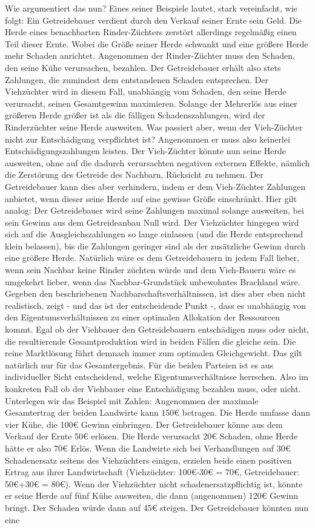 Wie argumentiert \textcite[S. 2ff]{Coase1960} das nun? Eines seiner Beispiele lautet, stark vereinfacht, wie folgt: Ein Getreidebauer verdient durch den Verkauf seiner Ernte sein Geld. Die Herde eines benachbarten Rinder-Züchters zerstört allerdings regelmäßig einen Teil dieser Ernte. Wobei die Größe seiner Herde schwankt und eine größere Herde mehr Schaden anrichtet. Angenommen der Rinder-Züchter muss den Schaden, den seine Kühe verursachen, bezahlen. Der Getreidebauer erhält also stets Zahlungen, die zumindest dem entstandenen Schaden entsprechen. Der Viehzüchter wird in diesem Fall, unabhängig vom Schaden, den seine Herde verursacht, seinen Gesamtgewinn maximieren. Solange der Mehrerlös aus einer größeren Herde größer ist als die fälligen Schadenszahlungen, wird der Rinderzüchter seine Herde ausweiten. Was passiert aber, wenn der Vieh-Züchter nicht zur Entschädigung verpflichtet ist? Angenommen er muss also keinerlei Entschädigungszahlungen leisten. Der Vieh-Züchter könnte nun seine Herde ausweiten, ohne auf die dadurch verursachten negativen externen Effekte, nämlich die Zerstörung des Getreide des Nachbarn, Rücksicht zu nehmen. Der Getreidebauer kann dies aber verhindern, indem er dem Vieh-Züchter Zahlungen anbietet, wenn dieser seine Herde auf eine gewisse Größe einschränkt. Hier gilt analog: Der Getreidebauer wird seine Zahlungen maximal solange ausweiten, bei sein Gewinn aus dem Getreideanbau Null wird. Der Viehzüchter hingegen wird sich auf die Ausgleichszahlungen so lange einlassen (und die Herde entsprechend klein belassen), bis die Zahlungen geringer sind als der zusätzliche Gewinn durch eine größere Herde. Natürlich wäre es dem Getreidebauern in jedem Fall lieber, wenn sein Nachbar keine Rinder züchten würde und dem Vieh-Bauern wäre es umgekehrt lieber, wenn das Nachbar-Grundstück unbewohntes Brachland wäre. Gegeben den beschriebenen Nachbarschaftsverhältnissen, ist dies aber eben nicht realistisch. \textcite{Coase1960} zeigt - und das ist der entscheidende Punkt -, dass es unabhängig von den Eigentumsverhältnissen zu einer optimalen Allokation der Ressourcen kommt. Egal ob der Viehbauer den Getreidebauern entschädigen muss oder nicht, die resultierende Gesamtproduktion wird in beiden Fällen die gleiche sein. Die reine Marktlösung führt demnach immer zum optimalen Gleichgewicht. Das gilt natürlich nur für das Gesamtergebnis. Für die beiden Parteien ist es aus individueller Sicht entscheidend, welche Eigentumsverhältnisse herrschen. Also im konkreten Fall ob der Viehbauer eine Entschädigung bezahlen muss, oder nicht. Unterlegen wir das Beispiel mit Zahlen: Angenommen der maximale Gesamtertrag der beiden Landwirte kann 150€ betragen. Die Herde umfasse dann vier Kühe, die 100€ Gewinn einbringen. Der Getreidebauer könne aus dem Verkauf der Ernte 50€ erlösen. Die Herde verursacht 20€ Schaden, ohne Herde hätte er also 70€ Erlös. Wenn die Landwirte sich bei Verhandlungen auf 30€ Schadenersatz seitens des Viehzüchters einigen, erzielen beide einen positiven Ertrag aus ihrer Landwirtschaft (Viehzüchter: 100€-30€ = 70€, Getreidebauer: 50€+30€ = 80€). Wenn der Viehzüchter nicht schadenersatzpflichtig ist, könnte er seine Herde auf fünf Kühe ausweiten, die dann (angenommen) 120€ Gewinn bringt. Der Schaden würde dann auf 45€ steigen. Der Getreidebauer könnten nun eine 